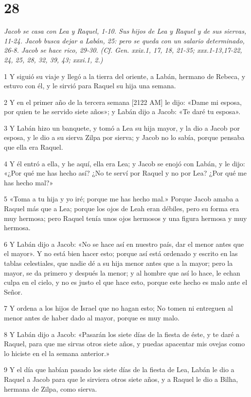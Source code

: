 \chapter{28}

\par \textit{Jacob se casa con Lea y Raquel, 1-10. Sus hijos de Lea y Raquel y de sus siervas, 11-24. Jacob busca dejar a Labán, 25: pero se queda con un salario determinado, 26-8. Jacob se hace rico, 29-30. (Cf. Gen. xxix.1, 17, 18, 21-35; xxx.1-13,17-22, 24, 25, 28, 32, 39, 43; xxxi.1, 2.)}

\par 1 Y siguió su viaje y llegó a la tierra del oriente, a Labán, hermano de Rebeca, y estuvo con él, y le sirvió para Raquel su hija una semana.
\par 2 Y en el primer año de la tercera semana [2122 AM] le dijo: «Dame mi esposa, por quien te he servido siete años»; y Labán dijo a Jacob: «Te daré tu esposa».
\par 3 Y Labán hizo un banquete, y tomó a Lea su hija mayor, y la dio a Jacob por esposa, y le dio a su sierva Zilpa por sierva; y Jacob no lo sabía, porque pensaba que ella era Raquel.
\par 4 Y él entró a ella, y he aquí, ella era Lea; y Jacob se enojó con Labán, y le dijo: «¿Por qué me has hecho así? ¿No te serví por Raquel y no por Lea? ¿Por qué me has hecho mal?»
\par 5 «Toma a tu hija y yo iré; porque me has hecho mal.» Porque Jacob amaba a Raquel más que a Lea; porque los ojos de Leah eran débiles, pero su forma era muy hermosa; pero Raquel tenía unos ojos hermosos y una figura hermosa y muy hermosa.
\par 6 Y Labán dijo a Jacob: «No se hace así en nuestro país, dar el menor antes que el mayor». Y no está bien hacer esto; porque así está ordenado y escrito en las tablas celestiales, que nadie dé a su hija menor antes que a la mayor; pero la mayor, se da primero y después la menor; y al hombre que así lo hace, le echan culpa en el cielo, y no es justo el que hace esto, porque este hecho es malo ante el Señor.
\par 7 Y ordena a los hijos de Israel que no hagan esto; No tomen ni entreguen al menor antes de haber dado al mayor, porque es muy malo.
\par 8 Y Labán dijo a Jacob: «Pasarán los siete días de la fiesta de éste, y te daré a Raquel, para que me sirvas otros siete años, y puedas apacentar mis ovejas como lo hiciste en el la semana anterior.»
\par 9 Y el día que habían pasado los siete días de la fiesta de Lea, Labán le dio a Raquel a Jacob para que le sirviera otros siete años, y a Raquel le dio a Bilha, hermana de Zilpa, como sierva.
